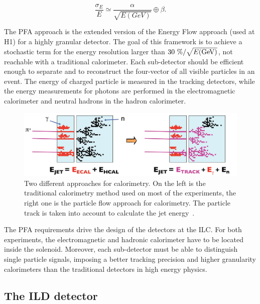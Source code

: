     \begin{equation}
      \frac{\sigma_E}{E} \simeq \frac{\alpha}{\sqrt{E(GeV)}} \oplus \beta.
      \label{eq:jet}
    \end{equation}

    The \gls{PFA} approach is the extended version of the Energy Flow approach (used at H1) for a highly granular detector. 
    The goal of this framework is to achieve a stochastic term for the energy resolution larger than $30~\% / \sqrt{E\rm{(GeV)}}$, not reachable with a traditional calorimeter.
    Each sub-detector should be efficient enough to separate and to reconstruct the four-vector of all visible particles in an event.
    The energy of charged particle is measured in the tracking detectors, while the energy measurements for photons are performed in the electromagnetic calorimeter and neutral hadrons in the hadron calorimeter.
     
     \begin{figure}[!h]
      \centering
      \includegraphics[width = 15cm]{Pictures/ILC/physics.jpg}
      \caption{Two different approaches for calorimetry. On the left is the traditional calorimetry method used on most of the experiments, the right one is the particle flow approach for calorimetry. The particle track is taken into account to calculate the jet energy~\cite{PFA}.}
      \label{fig:jetEnergy}
    \end{figure}   
    
    The \gls{PFA} requirements drive the design of the detectors at the \gls{ILC}.
    For both experiments, the electromagnetic and hadronic calorimeter have to be located inside the solenoid.
    Moreover, each sub-detector must be able to distinguish single particle signals, imposing a better tracking precision and higher granularity calorimeters than the traditional detectors in high energy physics.

    \subsection{The ILD detector}
    \label{sec:ILD}
    
